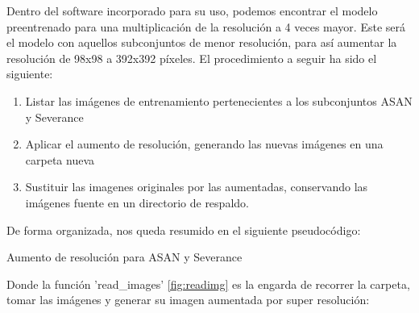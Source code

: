 Dentro del software incorporado para su uso, podemos encontrar el modelo preentrenado para una multiplicación de la resolución a 4 veces mayor. Este será el modelo con aquellos subconjuntos de menor resolución, para así aumentar la resolución de 98x98 a 392x392 píxeles. El procedimiento a seguir ha sido el siguiente:

\begin{enumerate}
	\item Listar las imágenes de entrenamiento pertenecientes a los subconjuntos ASAN y Severance
	\item Aplicar el aumento de resolución, generando las nuevas imágenes en una carpeta nueva
	\item Sustituir las imagenes originales por las aumentadas, conservando las imágenes fuente en un directorio de respaldo.
\end{enumerate}

De forma organizada, nos queda resumido en  el siguiente pseudocódigo:

\begin{algorithm}[H]
	\label{fig:escalar}
	\caption{ Aumento de resolución para ASAN y Severance}
	\begin{algorithmic}
				\State {}
				
				\State {}
				\State {}
		\EndIf
		\EndProcedure
		
	\end{algorithmic}
\end{algorithm}

Donde la función 'read\_images' \ref{fig:readimg} es la engarda de recorrer la carpeta, tomar las imágenes y generar su imagen aumentada por super resolución:

